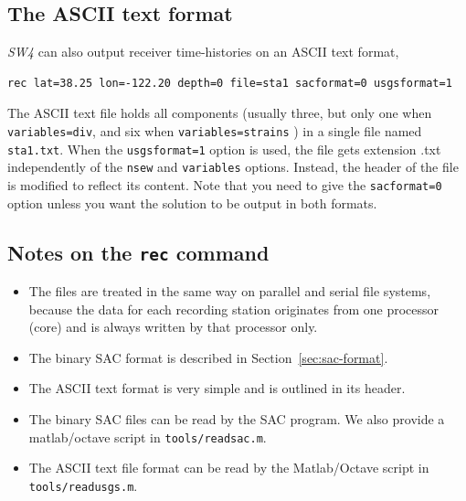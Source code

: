 \documentclass[11pt]{report}
\begin{document}

\subsection{The ASCII text format}
\emph{SW4} can also output receiver time-histories on an ASCII text format,
\begin{verbatim}
rec lat=38.25 lon=-122.20 depth=0 file=sta1 sacformat=0 usgsformat=1
\end{verbatim}
The ASCII text file holds all components (usually three, but only one when {\tt
  variables=div}, and six when {\tt variables=strains} ) in a single file named {\tt sta1.txt}. When
the \verb+usgsformat=1+ option is used, the file gets extension .txt independently of the
\verb+nsew+ and \verb+variables+ options.  Instead, the header of the file is modified to reflect
its content. Note that you need to give the \verb+sacformat=0+ option unless you want the solution
to be output in both formats.

\subsection{Notes on the {\tt rec} command}
\begin{itemize}
\item The files are treated in the same way on parallel and serial file systems, because the data
  for each recording station originates from one processor (core) and is always written by that processor only.
\item The binary SAC format is described in Section~\ref{sec:sac-format}.
\item The ASCII text format is very simple and is outlined in its header.
\item The binary SAC files can be read by the SAC program. We also provide a matlab/octave script in
  {\tt tools/readsac.m}.
\item The ASCII text file format can be read by the Matlab/Octave script in {\tt tools/readusgs.m}.
\end{itemize}
\end{document}
